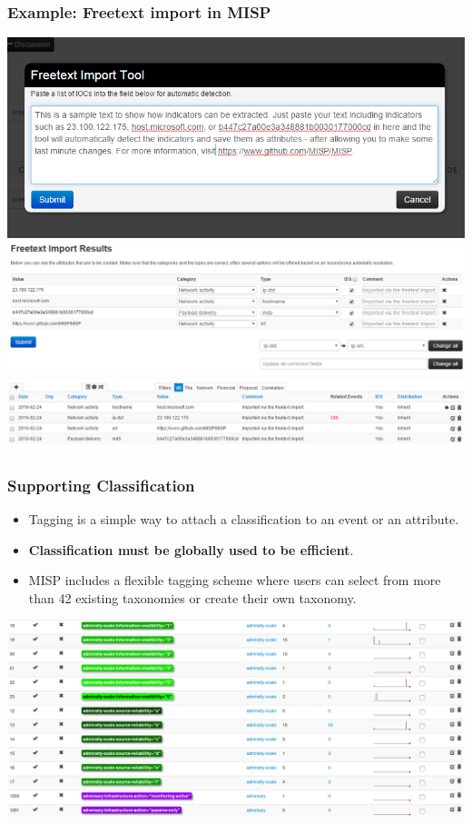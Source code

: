 \begin{frame}
        \frametitle{Example: Freetext import in MISP}
        \includegraphics[scale=0.3]{screenshots/freetext1.PNG}\\
        \includegraphics[scale=0.3]{screenshots/freetxt2.PNG}\\
        \includegraphics[scale=0.3]{screenshots/freetxt3.PNG}
\end{frame}

\begin{frame}
        \frametitle{Supporting Classification}
        \begin{itemize}
          \item Tagging is a simple way to attach a classification to an event or an attribute.
          \item {\bf Classification must be globally used to be efficient}.
          \item MISP includes a flexible tagging scheme where users can select from more than 42 existing taxonomies or create their own taxonomy.
        \end{itemize}
        \includegraphics[scale=0.20]{tags-2-4-70.png}
\end{frame}

